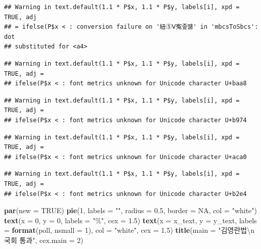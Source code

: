 \documentclass[
]{article}
\newenvironment{Shaded}{\begin{snugshade}}{\end{snugshade}}
\newcommand{\CharTok}[1]{\textcolor[rgb]{0.31,0.60,0.02}{#1}}
\newcommand{\DataTypeTok}[1]{\textcolor[rgb]{0.13,0.29,0.53}{#1}}
\newcommand{\DecValTok}[1]{\textcolor[rgb]{0.00,0.00,0.81}{#1}}
\newcommand{\FloatTok}[1]{\textcolor[rgb]{0.00,0.00,0.81}{#1}}
\newcommand{\KeywordTok}[1]{\textcolor[rgb]{0.13,0.29,0.53}{\textbf{#1}}}
\newcommand{\NormalTok}[1]{#1}
\newcommand{\OtherTok}[1]{\textcolor[rgb]{0.56,0.35,0.01}{#1}}
\newcommand{\StringTok}[1]{\textcolor[rgb]{0.31,0.60,0.02}{#1}}
\begin{document}
\begin{verbatim}
## Warning in text.default(1.1 * P$x, 1.1 * P$y, labels[i], xpd = TRUE, adj
## = ifelse(P$x < : conversion failure on '紐⑤Ⅴ寃좊떎' in 'mbcsToSbcs': dot
## substituted for <a4>
\end{verbatim}

\begin{verbatim}
## Warning in text.default(1.1 * P$x, 1.1 * P$y, labels[i], xpd = TRUE, adj =
## ifelse(P$x < : font metrics unknown for Unicode character U+baa8
\end{verbatim}

\begin{verbatim}
## Warning in text.default(1.1 * P$x, 1.1 * P$y, labels[i], xpd = TRUE, adj =
## ifelse(P$x < : font metrics unknown for Unicode character U+b974
\end{verbatim}

\begin{verbatim}
## Warning in text.default(1.1 * P$x, 1.1 * P$y, labels[i], xpd = TRUE, adj =
## ifelse(P$x < : font metrics unknown for Unicode character U+aca0
\end{verbatim}

\begin{verbatim}
## Warning in text.default(1.1 * P$x, 1.1 * P$y, labels[i], xpd = TRUE, adj =
## ifelse(P$x < : font metrics unknown for Unicode character U+b2e4
\end{verbatim}

\begin{Shaded}
\begin{Highlighting}[]
\KeywordTok{par}\NormalTok{(}\DataTypeTok{new =} \OtherTok{TRUE}\NormalTok{)}
\KeywordTok{pie}\NormalTok{(}\DecValTok{1}\NormalTok{,}
    \DataTypeTok{labels =} \StringTok{""}\NormalTok{,}
    \DataTypeTok{radius =} \FloatTok{0.5}\NormalTok{,}
    \DataTypeTok{border =} \OtherTok{NA}\NormalTok{,}
    \DataTypeTok{col =} \StringTok{"white"}\NormalTok{)}
\KeywordTok{text}\NormalTok{(}\DataTypeTok{x =} \DecValTok{0}\NormalTok{, }\DataTypeTok{y =} \DecValTok{0}\NormalTok{, }
     \DataTypeTok{labels =} \StringTok{"\%"}\NormalTok{, }
     \DataTypeTok{cex =} \FloatTok{1.5}\NormalTok{)}
\KeywordTok{text}\NormalTok{(}\DataTypeTok{x =}\NormalTok{ x\_text, }\DataTypeTok{y =}\NormalTok{ y\_text, }
     \DataTypeTok{labels =} \KeywordTok{format}\NormalTok{(poll, }\DataTypeTok{nsmall =} \DecValTok{1}\NormalTok{), }
     \DataTypeTok{col =} \StringTok{"white"}\NormalTok{, }
     \DataTypeTok{cex =} \FloatTok{1.5}\NormalTok{)}
\KeywordTok{title}\NormalTok{(}\DataTypeTok{main =} \StringTok{"김영란법}\CharTok{\textbackslash{}n}\StringTok{국회 통과"}\NormalTok{, }\DataTypeTok{cex.main =} \DecValTok{2}\NormalTok{)}
\end{Highlighting}
\end{Shaded}
\end{document}
